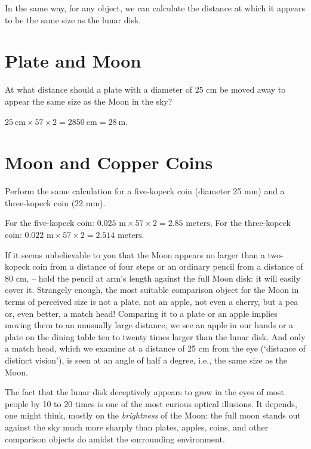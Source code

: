 In the same way, for any object, we can calculate the distance at which it appears to be the same size as the lunar disk.

\section{Plate and Moon} 
\label{sec-3.3}

\ques At what distance should a plate with a diameter of 25 cm be moved away to appear the same size as the Moon in the sky?

\ans $\SI{25}{\centi\meter} \times 57 \times 2 = \SI{2850}{\centi\meter} = \SI{28}{\meter}$.

\section{Moon and Copper Coins} 
\label{sec-3.4}

\ques Perform the same calculation for a five-kopeck coin (diameter 25 mm) and a three-kopeck coin (22 mm).

\ans For the five-kopeck coin: \(0.025 \text{ m} \times 57 \times 2 = 2.85 \text{ meters}\),
For the three-kopeck coin: \(0.022 \text{ m} \times 57 \times 2 = 2.514 \text{ meters}\).

If it seems unbelievable to you that the Moon appears no larger than a two-kopeck coin from a distance of four steps or an ordinary pencil from a distance of 80 cm, -- hold the pencil at arm's length against the full Moon disk: it will easily cover it. Strangely enough, the most suitable comparison object for the Moon in terms of perceived size is not a plate, not an apple, not even a cherry, but a pea or, even better, a match head! Comparing it to a plate or an apple implies moving them to an unusually large distance; we see an apple in our hands or a plate on the dining table ten to twenty times larger than the lunar disk. And only a match head, which we examine at a distance of 25 cm from the eye (`distance of distinct vision'), is seen at an angle of half a degree, i.e., the same size as the Moon.

The fact that the lunar disk deceptively appears to grow in the eyes of most people by 10 to 20 times is one of the most curious optical illusions. It depends, one might think, mostly on the \emph{brightness} of the Moon: the full moon stands out against the sky much more sharply than plates, apples, coins, and other comparison objects do amidst the surrounding environment.

